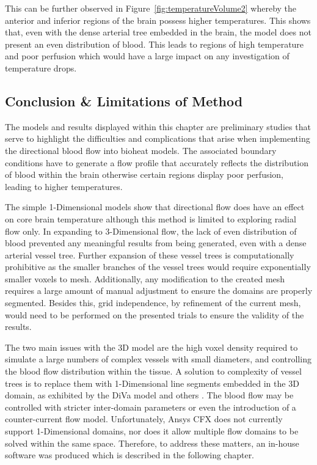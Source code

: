 \documentclass[11pt,english,a4paper,twoside,openright]{report}
\begin{document}
{{{{{{{{This can be further observed in Figure~\ref{fig:temperatureVolume2} whereby the anterior and inferior regions of the brain possess higher temperatures. This shows that, even with the dense arterial tree embedded in the brain, the model does not present an even distribution of blood. This leads to regions of high temperature and poor perfusion which would have a large impact on any investigation of temperature drops. 

\subsection{Conclusion \& Limitations of Method}

The models and results displayed within this chapter are preliminary studies that serve to highlight the difficulties and complications that arise when implementing the directional blood flow into bioheat models. The associated boundary conditions have to generate a flow profile that accurately reflects the distribution of blood within the brain otherwise certain regions display poor perfusion, leading to higher temperatures. 

The simple 1-Dimensional models show that directional flow does have an effect on core brain temperature although this method is limited to exploring radial flow only. In expanding to 3-Dimensional flow, the lack of even distribution of blood prevented any meaningful results from being generated, even with a dense arterial vessel tree. Further expansion of these vessel trees is computationally prohibitive as the smaller branches of the vessel trees would require exponentially smaller voxels to mesh. Additionally, any modification to the created mesh requires a large amount of manual adjustment to ensure the domains are properly segmented. Besides this, grid independence, by refinement of the current mesh, would need to be performed on the presented trials to ensure the validity of the results.

The two main issues with the 3D model are the high voxel density required to simulate a large numbers of complex vessels with small diameters, and controlling the blood flow distribution within the tissue. A solution to complexity of vessel trees is to replace them with 1-Dimensional line segments embedded in the 3D domain, as exhibited by the DiVa model \cite{kotte1996description} and others \cite{d2008coupling,reichold2009vascular}. The blood flow may be controlled with stricter inter-domain parameters or even the introduction of a counter-current flow model. Unfortunately, Ansys CFX does not currently support 1-Dimensional domains, nor does it allow multiple flow domains to be solved within the same space. Therefore, to address these matters, an in-house software was produced which is described in the following chapter. 

}}}}}}}}
\end{document}
